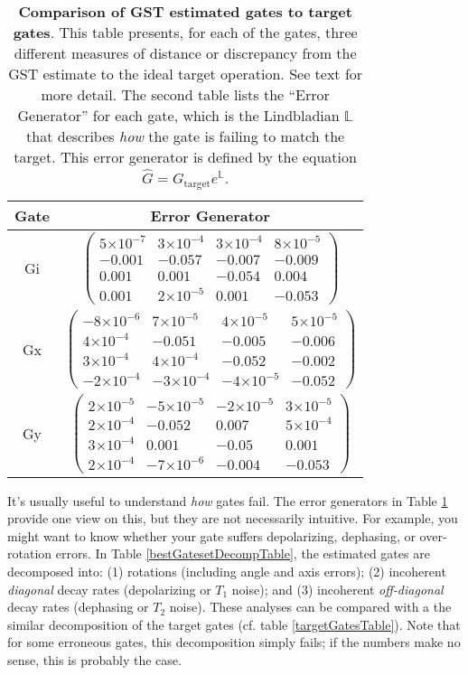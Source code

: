 \documentclass{article}[11pt]
\providecommand{\e}[1]{\ensuremath{\times 10^{#1}}}
\begin{document}
\begin{table}[h]
\begin{center}
\vspace{2em}
\begin{tabular}[l]{|c|c|}
\hline
Gate & Error Generator \\ \hline
Gi & $ \left(\!\!\begin{array}{cccc}
5\e{-7} & 3\e{-4} & 3\e{-4} & 8\e{-5} \\ 
-0.001 & -0.057 & -0.007 & -0.009 \\ 
0.001 & 0.001 & -0.054 & 0.004 \\ 
0.001 & 2\e{-5} & 0.001 & -0.053
 \end{array}\!\!\right) $
 \\ \hline
Gx & $ \left(\!\!\begin{array}{cccc}
-8\e{-6} & 7\e{-5} & 4\e{-5} & 5\e{-5} \\ 
4\e{-4} & -0.051 & -0.005 & -0.006 \\ 
3\e{-4} & 4\e{-4} & -0.052 & -0.002 \\ 
-2\e{-4} & -3\e{-4} & -4\e{-5} & -0.052
 \end{array}\!\!\right) $
 \\ \hline
Gy & $ \left(\!\!\begin{array}{cccc}
2\e{-5} & -5\e{-5} & -2\e{-5} & 3\e{-5} \\ 
2\e{-4} & -0.052 & 0.007 & 5\e{-4} \\ 
3\e{-4} & 0.001 & -0.05 & 0.001 \\ 
2\e{-4} & -7\e{-6} & -0.004 & -0.053
 \end{array}\!\!\right) $
 \\ \hline
\end{tabular}

\caption{\textbf{Comparison of GST estimated gates to target gates}.  This table presents, for each of the gates, three different measures of distance or discrepancy from the GST estimate to the ideal target operation.  See text for more detail.  The second table lists the ``Error Generator'' for each gate, which is the Lindbladian $\mathbb{L}$ that describes \emph{how} the gate is failing to match the target.  This error generator is defined by the equation $\hat{G} = G_{\mathrm{target}}e^{\mathbb{L}}$. \label{bestGatesetVsTargetTable}}
\end{center}
\end{table}

It's usually useful to understand \emph{how} gates fail.  The error generators in Table \ref{bestGatesetVsTargetTable} provide one view on this, but they are not necessarily intuitive.   For example, you might want to know whether your gate suffers depolarizing, dephasing, or over-rotation errors.  In Table \ref{bestGatesetDecompTable}, the estimated gates are decomposed into: (1) rotations (including angle and axis errors); (2) incoherent \emph{diagonal} decay rates (depolarizing or $T_1$ noise); and (3) incoherent \emph{off-diagonal} decay rates (dephasing or $T_2$ noise).  These analyses can be compared with a the similar decomposition of the target gates (cf. table \ref{targetGatesTable}).  Note that for some erroneous gates, this decomposition simply fails; if the numbers make no sense, this is probably the case.
\end{document}
